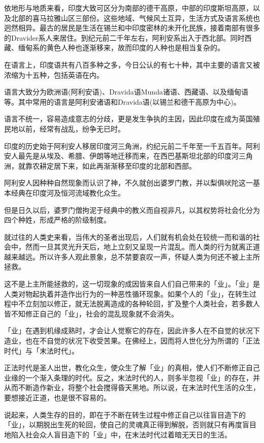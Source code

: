 \documentclass[twoside,openany]{book}
\begin{document}
依地形与地质来看，印度大致可区分为南部的德干高原，中部的印度斯坦高原，以及北部的喜马拉雅山区三部份。这些地域、气候风土互异，生活方式及语言系统也迥然相异。最古的居民是生活在锡兰和中印度密林的未开化民族，接着南部有很多的Dravider系人来居住。到纪元前二千年左右，阿利安系出入于西北部。同时西藏、缅甸系的黄色人种也逐渐移来，故而印度的人种也是相当复杂的。

在语言上，印度语共有八百多种之多，今日公认的有七十种，其中主要的语言又被浓缩为十五种，包括英语在内。

语言大致分为欧洲语(阿利安语)、Dravida语Munda诸语、西藏语、以及缅甸语等。其中常用的语言是阿利安诸语和Dravida语(以锡兰和德干高原为中心)。

语言不统一，容易造成意志的分歧，更是发生争执的主因，因此印度在成为英国殖民地以前，经常有战乱，纷争无已时。

印度的历史始于阿利安人移居印度河三角洲，约纪元前二千年至一千五百年。阿利安人最先是从埃及、希腊、伊朗等地迁移而来，在西巴基斯坦北部的印度河三角洲，就靠农耕定居下来，如此再渐渐移至印度的北部和西部。

阿利安人因种种自然现象而认识了神，不久就创出婆罗门教，并以梨俱吠陀这一基本经典在印度河及恒河流域教化众生。

但是日久以后，婆罗门僧拘泥于经典中的教义而自视非凡，以其权势将社会化分为四个种姓，形成严格的阶级制度。

就过往的人类史来看，当伟大的圣者出现后，人们就有机会处在较统一而和谐的社会中，然而一旦其灵光升天后，地上立刻又呈现一片混乱。而人类的行为就离正道越来越远。所以许多人观此景象，总不禁要哀叹一声，怀疑人类为何还不被上主所拯救。

这不是上主所能拯救的，这一切现象的成因皆来自人们自己带来的「业」。「业」是人类对物起执着并造作出行为的一种恶性循环现象。如果个人的「业」，在转生过程中不立刻加以修正，就无法脱离造成的各种轮回，扩及整个人类社会，若多数人皆不知修正自己的「业」，社会的混乱现象就不会消失。

「业」在遇到机缘成熟时，才会让人觉察它的存在，因此许多人在不自觉的状况下造业，也在不自觉的状况下收受苦果。在佛经上，因而将人世化分为所谓的「正法时代」与「末法时代」。

正法时代是圣人出世，教化众生，使众生了解「业」的真相，使人们不断修正自己业缘的一个渐入条理的时代。反之，末法时代的人，则多半忽视「业」的存在，并从而不断造作新业，将整个社会搅得昏天黑地。所以说，在末法时代生活的众生，要想接近正道，也是很不容易的。

说起来，人类生存的目的，即在于不断在转生过程中修正自己以往盲目造下的「业」，以期脱出生死的轮回，使自己的灵魂真正得到解脱，否则就只有再度盲目地陷入社会众人盲目造下的「业」中，在末法时代过着暗无天日的生活。
\end{document}

